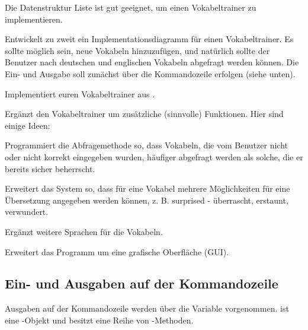 \documentclass[10pt, a4paper, ngerman]{arbeitsblatt}
\begin{document}
\ReiheTitel

\begin{aufgabe}
Die Datenstruktur Liste ist gut geeignet, um einen Vokabeltrainer zu implementieren.

\begin{enuma}
	\item\label{aufg:modell} Entwickelt zu zweit ein Implementationsdiagramm für einen Vokabeltrainer. Es sollte möglich sein, neue Vokabeln hinzuzufügen, und natürlich sollte der Benutzer nach deutschen und englischen Vokabeln abgefragt werden können. Die Ein- und Ausgabe soll zunächst über die Kommandozeile erfolgen (siehe unten).
	\item Implementiert euren Vokabeltrainer aus .
	\item Ergänzt den Vokabeltrainer um zusätzliche (sinnvolle) Funktionen. Hier sind einige Ideen:
	\begin{smallitem}
		\item Programmiert die Abfragemethode so, dass Vokabeln, die vom Benutzer nicht oder nicht korrekt eingegeben wurden, häufiger abgefragt werden als solche, die er bereits sicher beherrscht.
		\item Erweitert das System so, dass für eine Vokabel mehrere Möglichkeiten für eine Übersetzung angegeben werden können, z. B. surprised - überrascht, erstaunt, verwundert.
		\item Ergänzt weitere Sprachen für die Vokabeln.
		\item Erweitert das Programm um eine grafische Oberfläche (GUI).
	\end{smallitem}
\end{enuma}
\end{aufgabe}

\subsection*{Ein- und Ausgaben auf der Kommandozeile}

Ausgaben auf der Kommandozeile werden über die Variable  vorgenommen.  ist eine -Objekt und besitzt eine Reihe von -Methoden.

\end{document}

